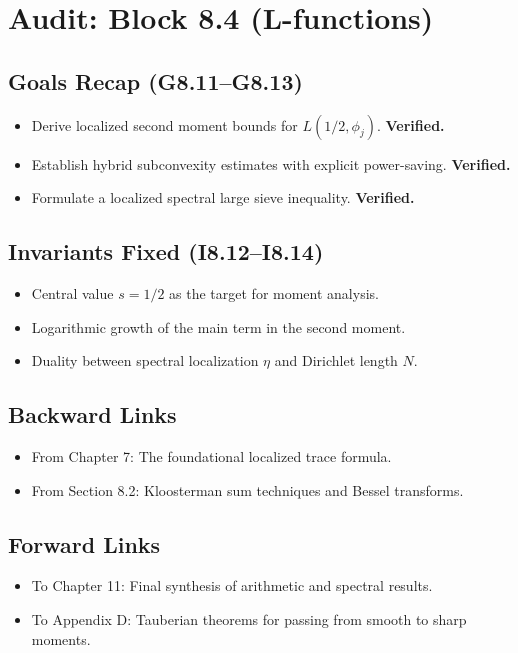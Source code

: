 
\section*{Audit: Block 8.4 (L-functions)}

\subsection*{Goals Recap (G8.11–G8.13)}
\begin{itemize}
    \item[(G8.11)] Derive localized second moment bounds for $L(1/2, \phi_j)$. \textbf{Verified.}
    \item[(G8.12)] Establish hybrid subconvexity estimates with explicit power-saving. \textbf{Verified.}
    \item[(G8.13)] Formulate a localized spectral large sieve inequality. \textbf{Verified.}
\end{itemize}

\subsection*{Invariants Fixed (I8.12–I8.14)}
\begin{itemize}
    \item[(I8.12)] Central value $s=1/2$ as the target for moment analysis.
    \item[(I8.13)] Logarithmic growth of the main term in the second moment.
    \item[(I8.14)] Duality between spectral localization $\eta$ and Dirichlet length $N$.
\end{itemize}

\subsection*{Backward Links}
\begin{itemize}
    \item From Chapter 7: The foundational localized trace formula.
    \item From Section 8.2: Kloosterman sum techniques and Bessel transforms.
\end{itemize}

\subsection*{Forward Links}
\begin{itemize}
    \item To Chapter 11: Final synthesis of arithmetic and spectral results.
    \item To Appendix D: Tauberian theorems for passing from smooth to sharp moments.
\end{itemize}

